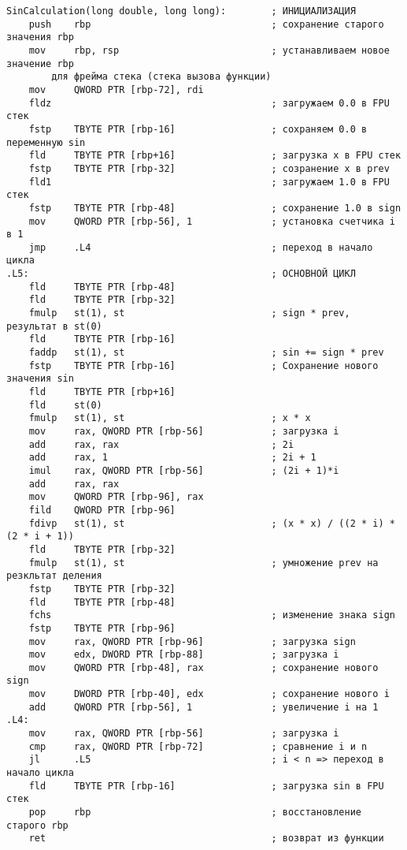 \documentclass[12pt,a4paper]{article}
\numberwithin{subsection}{section}
\begin{document}
\begin{verbatim}
SinCalculation(long double, long long):        ; ИНИЦИАЛИЗАЦИЯ            
    push    rbp                                ; сохранение старого значения rbp
    mov     rbp, rsp                           ; устанавливаем новое значение rbp 
        для фрейма стека (стека вызова функции)
    mov     QWORD PTR [rbp-72], rdi
    fldz                                       ; загружаем 0.0 в FPU стек
    fstp    TBYTE PTR [rbp-16]                 ; сохраняем 0.0 в переменную sin
    fld     TBYTE PTR [rbp+16]                 ; загрузка x в FPU стек
    fstp    TBYTE PTR [rbp-32]                 ; созранение x в prev
    fld1                                       ; загружаем 1.0 в FPU стек
    fstp    TBYTE PTR [rbp-48]                 ; сохранение 1.0 в sign
    mov     QWORD PTR [rbp-56], 1              ; установка счетчика i в 1
    jmp     .L4                                ; переход в начало цикла
.L5:                                           ; ОСНОВНОЙ ЦИКЛ
    fld     TBYTE PTR [rbp-48]
    fld     TBYTE PTR [rbp-32]
    fmulp   st(1), st                          ; sign * prev, результат в st(0)
    fld     TBYTE PTR [rbp-16]
    faddp   st(1), st                          ; sin += sign * prev
    fstp    TBYTE PTR [rbp-16]                 ; Сохранение нового значения sin
    fld     TBYTE PTR [rbp+16]
    fld     st(0)
    fmulp   st(1), st                          ; x * x
    mov     rax, QWORD PTR [rbp-56]            ; загрузка i
    add     rax, rax                           ; 2i
    add     rax, 1                             ; 2i + 1
    imul    rax, QWORD PTR [rbp-56]            ; (2i + 1)*i
    add     rax, rax
    mov     QWORD PTR [rbp-96], rax
    fild    QWORD PTR [rbp-96]
    fdivp   st(1), st                          ; (x * x) / ((2 * i) * (2 * i + 1))
    fld     TBYTE PTR [rbp-32]
    fmulp   st(1), st                          ; умножение prev на резкльтат деления
    fstp    TBYTE PTR [rbp-32]
    fld     TBYTE PTR [rbp-48]
    fchs                                       ; изменение знака sign
    fstp    TBYTE PTR [rbp-96]
    mov     rax, QWORD PTR [rbp-96]            ; загрузка sign
    mov     edx, DWORD PTR [rbp-88]            ; загрузка i
    mov     QWORD PTR [rbp-48], rax            ; сохранение нового sign
    mov     DWORD PTR [rbp-40], edx            ; сохранение нового i
    add     QWORD PTR [rbp-56], 1              ; увеличение i на 1
.L4:
    mov     rax, QWORD PTR [rbp-56]            ; загрузка i
    cmp     rax, QWORD PTR [rbp-72]            ; сравнение i и n
    jl      .L5                                ; i < n => переход в начало цикла
    fld     TBYTE PTR [rbp-16]                 ; загрузка sin в FPU стек
    pop     rbp                                ; восстановление старого rbp
    ret                                        ; возврат из функции

\end{verbatim}
\end{document}

